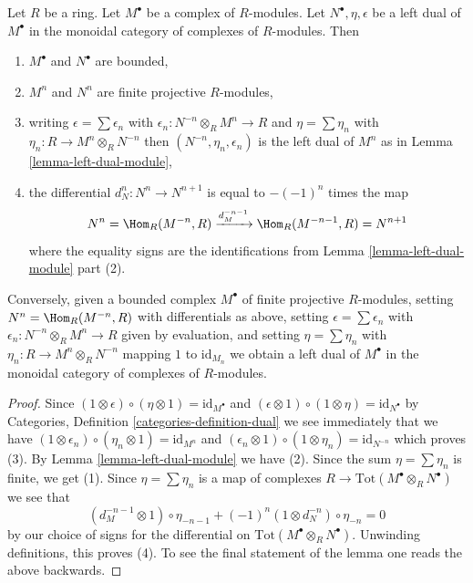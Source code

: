 \begin{lemma}
\label{lemma-left-dual-complex}
Let $R$ be a ring. Let $M^\bullet$ be a complex of $R$-modules.
Let $N^\bullet, \eta, \epsilon$ be a left dual of $M^\bullet$
in the monoidal category of complexes of $R$-modules.
Then
\begin{enumerate}
\item $M^\bullet$ and $N^\bullet$ are bounded,
\item $M^n$ and $N^n$ are finite projective $R$-modules,
\item writing $\epsilon = \sum \epsilon_n$
with $\epsilon_n : N^{-n} \otimes_R M^n \to R$ and $\eta = \sum \eta_n$
with $\eta_n : R \to  M^n \otimes_R N^{-n}$ then $(N^{-n}, \eta_n, \epsilon_n)$
is the left dual of $M^n$ as in Lemma \ref{lemma-left-dual-module},
\item the differential $d_N^n : N^n \to N^{n + 1}$ is equal
to $-(-1)^n$ times the map
$$
N^n = \Hom_R(M^{-n}, R)
\xrightarrow{d_M^{-n - 1}}
\Hom_R(M^{-n - 1}, R) = N^{n + 1}
$$
where the equality signs are the identifications from
Lemma \ref{lemma-left-dual-module} part (2).
\end{enumerate}
Conversely, given a bounded complex $M^\bullet$ of finite projective
$R$-modules, setting $N^n = \Hom_R(M^{-n}, R)$ with differentials as above,
setting $\epsilon = \sum \epsilon_n$ with
$\epsilon_n : N^{-n} \otimes_R M^n \to R$ given by evaluation, and
setting $\eta = \sum \eta_n$ with $\eta_n : R \to M^n \otimes_R N^{-n}$
mapping $1$ to $\text{id}_{M_n}$ we obtain a left dual of $M^\bullet$
in the monoidal category of complexes of $R$-modules.
\end{lemma}

\begin{proof}
Since $(1 \otimes \epsilon) \circ (\eta \otimes 1) = \text{id}_{M^\bullet}$
and $(\epsilon \otimes 1) \circ (1 \otimes \eta) = \text{id}_{N^\bullet}$ by
Categories, Definition \ref{categories-definition-dual} we see immediately
that we have
$(1 \otimes \epsilon_n) \circ (\eta_n \otimes 1) = \text{id}_{M^n}$
and $(\epsilon_n \otimes 1) \circ (1 \otimes \eta_n) = \text{id}_{N^{-n}}$
which proves (3). By Lemma \ref{lemma-left-dual-module} we have (2).
Since the sum $\eta = \sum \eta_n$ is finite, we get (1).
Since $\eta = \sum \eta_n$ is a map of complexes
$R \to \text{Tot}(M^\bullet \otimes_R N^\bullet)$ we see that
$$
(d_M^{-n - 1} \otimes 1) \circ \eta_{-n - 1}  +
(-1)^n (1 \otimes d_N^{-n}) \circ \eta_{-n} = 0
$$
by our choice of signs for the differential on
$\text{Tot}(M^\bullet \otimes_R N^\bullet)$.
Unwinding definitions, this proves (4). To see the final statement
of the lemma one reads the above backwards.
\end{proof}

